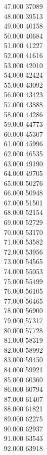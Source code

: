 { 47.000	37089 \\
 48.000	39513 \\
 49.000	40158 \\
 50.000	40684 \\
 51.000	41227 \\
 52.000	41616 \\
 53.000	42010 \\
 54.000	42424 \\
 55.000	43092 \\
 56.000	43423 \\
 57.000	43888 \\
 58.000	44286 \\
 59.000	44773 \\
 60.000	45307 \\
 61.000	45996 \\
 62.000	46535 \\
 63.000	49190 \\
 64.000	49705 \\
 65.000	50276 \\
 66.000	50948 \\
 67.000	51501 \\
 68.000	52154 \\
 69.000	52729 \\
 70.000	53170 \\
 71.000	53582 \\
 72.000	53956 \\
 73.000	54565 \\
 74.000	55053 \\
 75.000	55499 \\
 76.000	56105 \\
 77.000	56465 \\
 78.000	56900 \\
 79.000	57317 \\
 80.000	57728 \\
 81.000	58319 \\
 82.000	58992 \\
 83.000	59450 \\
 84.000	59921 \\
 85.000	60360 \\
 86.000	60794 \\
 87.000	61407 \\
 88.000	61821 \\
 89.000	62275 \\
 90.000	62937 \\
 91.000	63543 \\
 92.000	63918 \\
}
